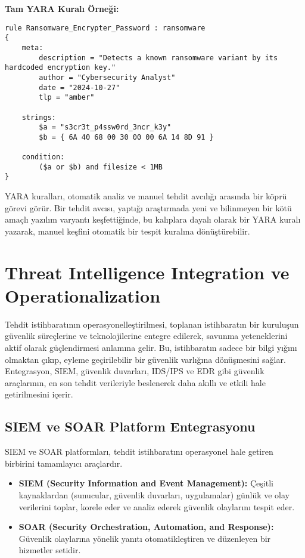 \textbf{Tam YARA Kuralı Örneği:}
\begin{verbatim}
rule Ransomware_Encrypter_Password : ransomware
{
    meta:
        description = "Detects a known ransomware variant by its hardcoded encryption key."
        author = "Cybersecurity Analyst"
        date = "2024-10-27"
        tlp = "amber"

    strings:
        $a = "s3cr3t_p4ssw0rd_3ncr_k3y"
        $b = { 6A 40 68 00 30 00 00 6A 14 8D 91 }

    condition:
        ($a or $b) and filesize < 1MB
}
\end{verbatim}

YARA kuralları, otomatik analiz ve manuel tehdit avcılığı arasında bir köprü görevi görür. Bir tehdit avcısı, yaptığı araştırmada yeni ve bilinmeyen bir kötü amaçlı yazılım varyantı keşfettiğinde, bu kalıplara dayalı olarak bir YARA kuralı yazarak, manuel keşfini otomatik bir tespit kuralına dönüştürebilir.

\section{Threat Intelligence Integration ve Operationalization}

Tehdit istihbaratının operasyonelleştirilmesi, toplanan istihbaratın bir kuruluşun güvenlik süreçlerine ve teknolojilerine entegre edilerek, savunma yeteneklerini aktif olarak güçlendirmesi anlamına gelir. Bu, istihbaratın sadece bir bilgi yığını olmaktan çıkıp, eyleme geçirilebilir bir güvenlik varlığına dönüşmesini sağlar. Entegrasyon, SIEM, güvenlik duvarları, IDS/IPS ve EDR gibi güvenlik araçlarının, en son tehdit verileriyle beslenerek daha akıllı ve etkili hale getirilmesini içerir.

\subsection{SIEM ve SOAR Platform Entegrasyonu}

SIEM ve SOAR platformları, tehdit istihbaratını operasyonel hale getiren birbirini tamamlayıcı araçlardır.

\begin{itemize}
    \item \textbf{SIEM (Security Information and Event Management):} Çeşitli kaynaklardan (sunucular, güvenlik duvarları, uygulamalar) günlük ve olay verilerini toplar, korele eder ve analiz ederek güvenlik olaylarını tespit eder.
    \item \textbf{SOAR (Security Orchestration, Automation, and Response):} Güvenlik olaylarına yönelik yanıtı otomatikleştiren ve düzenleyen bir hizmetler setidir.
\end{itemize}

